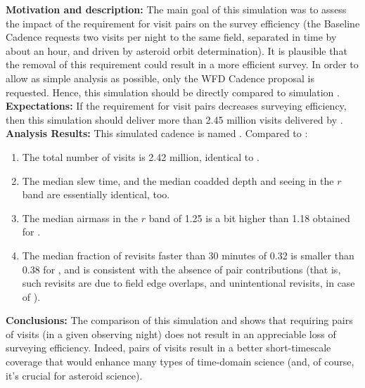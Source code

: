 

{\bf Motivation and description:} The main goal of this simulation was
to assess the impact of the requirement for visit pairs on the survey
efficiency (the Baseline Cadence requests two visits per night to the same
field, separated in time by about an hour, and driven by asteroid
orbit determination). It is plausible that the removal of this
requirement could result in a more efficient survey. In order to allow
as simple analysis as possible, only the WFD Cadence proposal is
requested. Hence, this simulation should be directly compared to
simulation . \\

{\bf Expectations:} If the requirement for visit pairs decreases
surveying efficiency, then this simulation should deliver more than
2.45 million visits delivered by . \\

{\bf Analysis Results:} This simulated cadence is named . Compared
to :
\begin{enumerate}
\item The total number of visits is 2.42 million, identical to .
\item The median slew time, and the median coadded depth and seeing in the $r$ band
are essentially identical, too.
\item The median airmass in the $r$ band of 1.25 is a bit higher than 1.18 obtained
for .
\item The median fraction of revisits faster than 30 minutes of 0.32 is smaller than 0.38
for , and is consistent with the absence of pair contributions (that is,
such revisits are due to field edge overlaps, and unintentional revisits, in case of ).
\end{enumerate}

{\bf Conclusions:} The comparison of this simulation and
 shows that requiring pairs of visits (in a
given observing night) does not result in an appreciable loss of
surveying efficiency. Indeed, pairs of visits result in a better
short-timescale coverage that would enhance many types of time-domain
science (and, of course, it's crucial for asteroid science).


